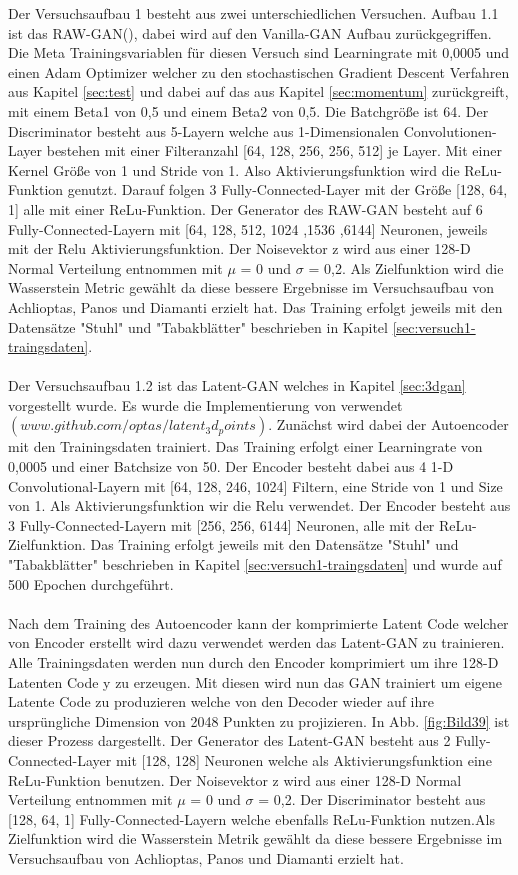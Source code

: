 \documentclass{llncs}
\begin{document}
Der Versuchsaufbau 1 besteht aus zwei unterschiedlichen Versuchen. Aufbau 1.1 ist das RAW-GAN(\cite{3dgan}), dabei wird auf den Vanilla-GAN Aufbau zurückgegriffen. Die Meta Trainingsvariablen für diesen Versuch sind Learningrate mit 0,0005 und einen Adam Optimizer welcher zu den stochastischen Gradient Descent Verfahren aus Kapitel \ref{sec:test} und dabei auf das aus Kapitel \ref{sec:momentum} zurückgreift, mit einem Beta1 von 0,5 und einem Beta2 von 0,5. Die Batchgröße ist 64. Der Discriminator besteht aus 5-Layern welche aus 1-Dimensionalen Convolutionen-Layer bestehen mit einer Filteranzahl [64, 128, 256, 256, 512] je Layer. Mit einer Kernel Größe von 1 und Stride von 1. Also Aktivierungsfunktion wird die ReLu-Funktion genutzt. Darauf folgen 3 Fully-Connected-Layer mit der Größe [128, 64, 1] alle mit einer ReLu-Funktion. Der Generator des RAW-GAN besteht auf 6 Fully-Connected-Layern mit [64, 128, 512, 1024 ,1536 ,6144] Neuronen, jeweils mit der Relu Aktivierungsfunktion. Der Noisevektor z wird aus einer 128-D Normal Verteilung entnommen mit $\mu$ = 0 und $\sigma$ =  0,2. Als Zielfunktion wird die Wasserstein Metric gewählt da diese bessere Ergebnisse im Versuchsaufbau von Achlioptas, Panos und Diamanti\cite{3dgan} erzielt hat. Das Training erfolgt jeweils mit den Datensätze "Stuhl" und "Tabakblätter" beschrieben in Kapitel \ref{sec:versuch1-traingsdaten}.
\\\\
Der Versuchsaufbau 1.2 ist das Latent-GAN welches in Kapitel \ref{sec:3dgan} vorgestellt wurde. Es wurde die Implementierung von \cite{3dgan} verwendet $(www.github.com/optas/latent_3d_points)$. Zunächst wird dabei der Autoencoder mit den Trainingsdaten trainiert. Das Training erfolgt einer Learningrate von 0,0005 und einer Batchsize von 50. Der Encoder besteht dabei aus 4 1-D Convolutional-Layern mit [64, 128, 246, 1024] Filtern, eine Stride von 1 und Size von 1. Als Aktivierungsfunktion wir die Relu verwendet. Der Encoder besteht aus 3 Fully-Connected-Layern mit [256, 256, 6144] Neuronen, alle mit der ReLu-Zielfunktion. Das Training erfolgt jeweils mit den Datensätze "Stuhl" und "Tabakblätter" beschrieben in Kapitel \ref{sec:versuch1-traingsdaten} und wurde auf 500 Epochen durchgeführt. 
\\\\
Nach dem Training des Autoencoder kann der komprimierte Latent Code welcher von Encoder erstellt wird dazu verwendet werden das Latent-GAN zu trainieren. Alle Trainingsdaten werden nun durch den Encoder komprimiert um ihre 128-D Latenten Code y zu erzeugen. Mit diesen wird nun das GAN trainiert um eigene Latente Code zu produzieren welche von den Decoder wieder auf ihre ursprüngliche Dimension von 2048 Punkten zu projizieren. In Abb. \ref{fig:Bild39} ist dieser Prozess dargestellt. Der Generator des Latent-GAN besteht aus 2 Fully-Connected-Layer mit [128, 128] Neuronen welche als Aktivierungsfunktion eine ReLu-Funktion benutzen. Der Noisevektor z wird aus einer 128-D Normal Verteilung entnommen mit $\mu$ = 0 und $\sigma$ =  0,2. Der Discriminator besteht aus [128, 64, 1] Fully-Connected-Layern welche ebenfalls ReLu-Funktion nutzen.Als Zielfunktion wird die Wasserstein Metrik gewählt da diese bessere Ergebnisse im Versuchsaufbau von Achlioptas, Panos und Diamanti\cite{3dgan} erzielt hat. 
\end{document}
